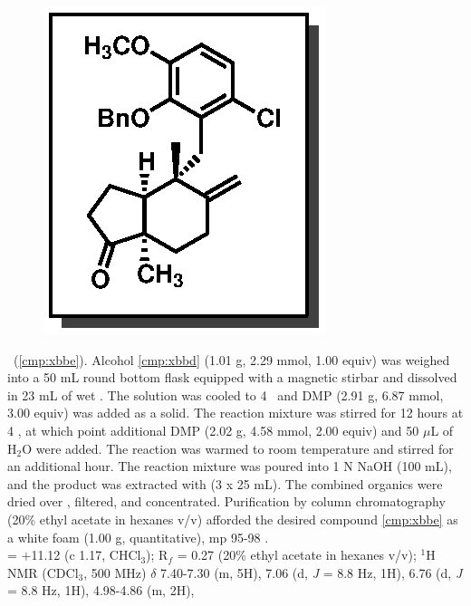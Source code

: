 \vspace{10pt}
\begin{figure}
  \vspace{-25pt}
  \begin{center}
    \includegraphics[scale=0.8]{chp_singlecarbon/images/xbbe}
  \end{center}
  \vspace{-30pt}
\end{figure}\noindent \textbf{\CMPxbbe}\ (\ref{cmp:xbbe}). Alcohol \ref{cmp:xbbd} (1.01 g, 2.29
mmol, 1.00 equiv) was weighed into a 50 mL round bottom flask equipped with a
magnetic stirbar and dissolved in 23 mL of wet . The solution was
cooled to 4 \degc\  and DMP (2.91 g, 6.87 mmol, 3.00 equiv)
was added as a solid. The reaction mixture was stirred for 12 hours at 4 \degc,
at which point additional DMP (2.02 g, 4.58 mmol, 2.00 equiv) and 50 $\mu$L of
H$_2$O were added. The reaction was warmed to room temperature and stirred for an additional
hour. The reaction mixture was poured into 1 N NaOH (100 mL), and the product was extracted
with  (3 x 25 mL). The combined organics were dried over , filtered, and
concentrated. Purification by column chromatography (20\% ethyl acetate in hexanes v/v) afforded the
desired compound \ref{cmp:xbbe} as a white foam (1.00 g, quantitative), mp 95-98 \degc. \\
\rotation = $+$11.12 (c 1.17, CHCl$_3$); R$_f$ = 0.27 (20\% ethyl acetate in hexanes v/v); $^1$H NMR (CDCl$_3$, 500
MHz) $\delta$ 7.40-7.30 (m, 5H), 7.06 (d, \textit{J} = 8.8 Hz, 1H), 6.76 (d, \textit{J} = 8.8 Hz, 1H), 4.98-4.86 (m, 2H),
